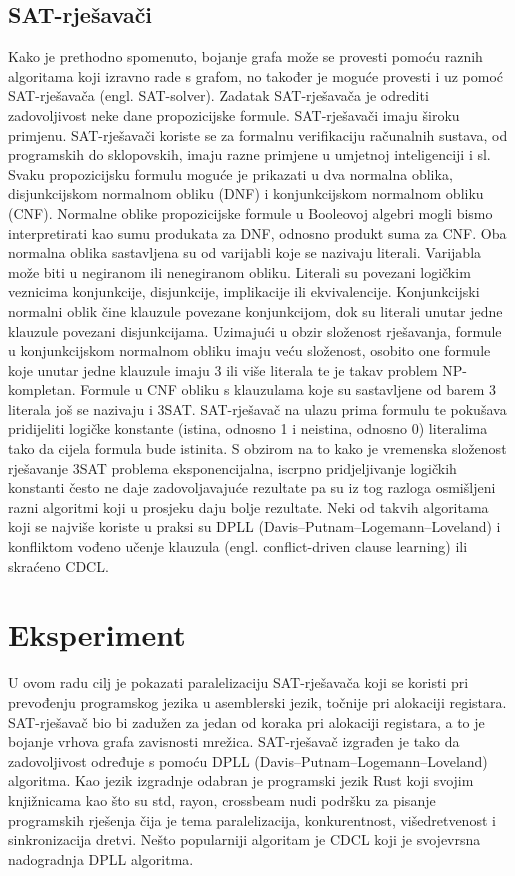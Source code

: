 \documentclass[hidelinks, conference]{IEEEtran}
\begin{document}
\subsection{SAT-rješavači}
Kako je prethodno spomenuto, bojanje grafa može se provesti pomoću raznih algoritama koji izravno rade s grafom, no također je moguće provesti i uz pomoć SAT-rješavača (engl. SAT-solver). Zadatak SAT-rješavača je odrediti zadovoljivost neke dane propozicijske formule. SAT-rješavači imaju široku primjenu. SAT-rješavači koriste se za formalnu verifikaciju računalnih sustava, od programskih do sklopovskih, imaju razne primjene u umjetnoj inteligenciji i sl. Svaku propozicijsku formulu moguće je prikazati u dva normalna oblika, disjunkcijskom normalnom obliku (DNF) i konjunkcijskom normalnom obliku (CNF). Normalne oblike propozicijske formule u Booleovoj algebri mogli bismo interpretirati kao sumu produkata za DNF, odnosno produkt suma za CNF. Oba normalna oblika sastavljena su od varijabli koje se nazivaju literali. Varijabla može biti u negiranom ili nenegiranom obliku. Literali su povezani logičkim veznicima konjunkcije, disjunkcije, implikacije ili ekvivalencije. Konjunkcijski normalni oblik čine klauzule povezane konjunkcijom, dok su literali unutar jedne klauzule povezani disjunkcijama. Uzimajući u obzir složenost rješavanja, formule u konjunkcijskom normalnom obliku imaju veću složenost, osobito one formule koje unutar jedne klauzule imaju 3 ili više literala te je takav problem NP-kompletan. Formule u CNF obliku s klauzulama koje su sastavljene od barem 3 literala još se nazivaju i 3SAT. SAT-rješavač na ulazu prima formulu te pokušava pridijeliti logičke konstante (istina, odnosno 1 i neistina, odnosno 0) literalima tako da cijela formula bude istinita. S obzirom na to kako je vremenska složenost rješavanje 3SAT problema eksponencijalna, iscrpno pridjeljivanje logičkih konstanti često ne daje zadovoljavajuće rezultate pa su iz tog razloga osmišljeni razni algoritmi koji u prosjeku daju bolje rezultate. Neki od takvih algoritama koji se najviše koriste u praksi su DPLL (Davis–Putnam–Logemann–Loveland) i konfliktom vođeno učenje klauzula (engl. conflict-driven clause learning) ili skraćeno CDCL.

\section{Eksperiment}

U ovom radu cilj je pokazati paralelizaciju SAT-rješavača koji se koristi pri prevođenju programskog jezika u asemblerski jezik, točnije pri alokaciji registara. SAT-rješavač bio bi zadužen za jedan od koraka pri alokaciji registara, a to je bojanje vrhova grafa zavisnosti mrežica. SAT-rješavač izgrađen je tako da zadovoljivost određuje s pomoću DPLL (Davis–Putnam–Logemann–Loveland) algoritma. Kao jezik izgradnje odabran je programski jezik Rust koji svojim knjižnicama kao što su std, rayon, crossbeam nudi podršku za pisanje programskih rješenja čija je tema paralelizacija, konkurentnost, višedretvenost i sinkronizacija dretvi. Nešto popularniji algoritam je CDCL koji je svojevrsna nadogradnja DPLL algoritma.
\end{document}
